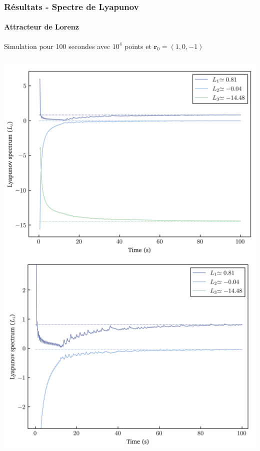 \begin{frame}
    \frametitle{Résultats - Spectre de Lyapunov}
    \framesubtitle{Attracteur de Lorenz}
    Simulation pour 100 secondes avec $10^4$ points et $\bm{r}_0 = (1, 0, -1)$
    \vspace{1cm}
    \begin{columns}
        \centering
        \includegraphics[scale=0.4]{figures/lyapunovs/lyap_lorenz.png}
        \includegraphics[scale=0.4]{figures/lyapunovs/lyap_lorenz_zoom.png}
    \end{columns}
\end{frame}

